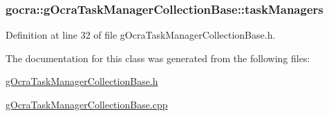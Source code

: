 \subsubsection[{\texorpdfstring{task\+Managers}{taskManagers}}]{ gocra\+::g\+Ocra\+Task\+Manager\+Collection\+Base\+::task\+Managers\hspace{0.3cm}{\ttfamily [protected]}}\hypertarget{classgocra_1_1gOcraTaskManagerCollectionBase_a247b32be87662be87239195b726fabca}{}\label{classgocra_1_1gOcraTaskManagerCollectionBase_a247b32be87662be87239195b726fabca}


Definition at line 32 of file g\+Ocra\+Task\+Manager\+Collection\+Base.\+h.



The documentation for this class was generated from the following files\+:\begin{DoxyCompactItemize}
\item 
\hyperlink{gOcraTaskManagerCollectionBase_8h}{g\+Ocra\+Task\+Manager\+Collection\+Base.\+h}\item 
\hyperlink{gOcraTaskManagerCollectionBase_8cpp}{g\+Ocra\+Task\+Manager\+Collection\+Base.\+cpp}\end{DoxyCompactItemize}
